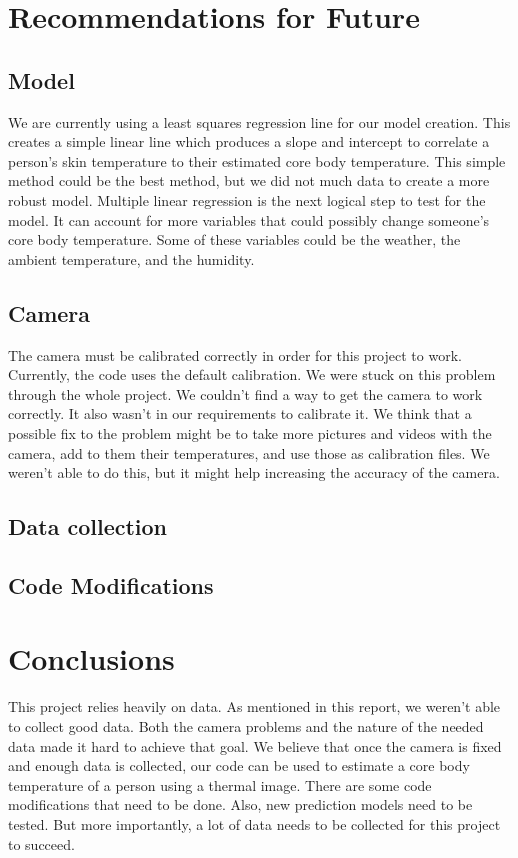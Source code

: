 \section*{Recommendations for Future}
\subsection*{Model}
We are currently using a least squares regression line for our model creation. This creates a simple linear line which produces a slope and intercept to correlate a person’s skin temperature to their estimated core body temperature. This simple method could be the best method, but we did not much data to create a more robust model.
Multiple linear regression is the next logical step to test for the model. It can account for more variables that could possibly change someone’s core body temperature. Some of these variables could be the weather, the ambient temperature, and the humidity. 

\subsection*{Camera}
The camera must be calibrated correctly in order for this project to work. Currently, the code uses the default calibration. We were stuck on this problem through the whole project. We couldn't find a way to get the camera to work correctly. It also wasn't in our requirements to calibrate it. We think that a possible fix to the problem might be to take more pictures and videos with the camera, add to them their temperatures, and use those as calibration files. We weren't able to do this, but it might help increasing the accuracy of the camera.

\subsection*{Data collection}
\subsection*{Code Modifications}

\section*{Conclusions}
This project relies heavily on data. As mentioned in this report, we weren't able to collect good data. Both the camera problems and the nature of the needed data made it hard to achieve that goal. We believe that once the camera is fixed and enough data is collected, our code can be used to estimate a core body temperature of a person using a thermal image. There are some code modifications that need to be done. Also, new prediction models need to be tested. But more importantly, a lot of data needs to be collected for this project to succeed. 

